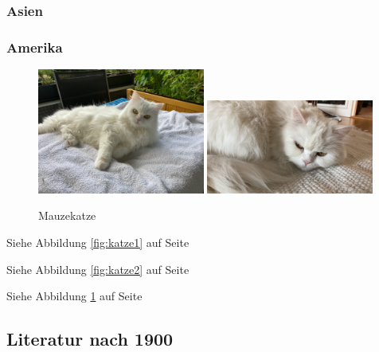 \blindtext

\subsubsection{Asien}

\blindtext 

\blindtext

\blindtext

\subsubsection{Amerika}

\blindtext 

\begin{figure}[tb]
{\includegraphics[width=0.49\textwidth]{./Bilder/Katze1.jpg}
}
{\includegraphics[width=0.49\textwidth]{./Bilder/miau.jpg}
}
\caption{Mauzekatze}\label{fig:zweikatzen}
\end{figure}

Siehe Abbildung \ref{fig:katze1} auf Seite \pageref{fig:katze1}

Siehe Abbildung \ref{fig:katze2} auf Seite \pageref{fig:katze2}

Siehe Abbildung \ref{fig:zweikatzen} auf Seite \pageref{fig:zweikatzen}

\blindtext

\blindtext

\subsection{Literatur nach 1900}

